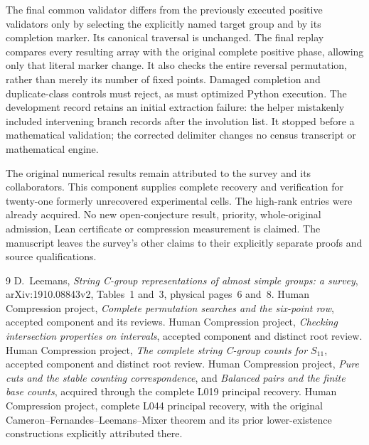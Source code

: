 \documentclass[10pt,a4paper]{article}
\begin{document}
The final common validator differs from the previously executed positive
validators only by selecting the explicitly named target group and by its
completion marker. Its canonical traversal is unchanged. The final replay
compares every resulting array with the original complete positive phase,
allowing only that literal marker change. It also checks the entire reversal
permutation, rather than merely its number of fixed points. Damaged completion
and duplicate-class controls must reject, as must optimized Python execution.
The development record retains an initial extraction failure: the helper
mistakenly included intervening branch records after the involution list.
It stopped before a mathematical validation; the corrected delimiter changes
no census transcript or mathematical engine.

The original numerical results remain attributed to the survey and its
collaborators. This component supplies complete recovery and verification
for twenty-one formerly unrecovered experimental cells. The high-rank
entries were already acquired. No new open-conjecture result, priority,
whole-original admission, Lean certificate or compression measurement is
claimed. The manuscript leaves the survey's other claims to their explicitly
separate proofs and source qualifications.

\begin{thebibliography}{9}\small
{} D.~Leemans, \emph{String C-group representations of almost
simple groups: a survey}, arXiv:1910.08843v2, Tables~1 and~3, physical
pages~6 and~8.
 Human Compression project, \emph{Complete permutation
searches and the six-point row}, accepted component and its reviews.
 Human Compression project, \emph{Checking intersection
properties on intervals}, accepted component and distinct root review.
 Human Compression project, \emph{The complete string
C-group counts for $S_{11}$}, accepted component and distinct root review.
 Human Compression project, \emph{Pure cuts and the stable
counting correspondence}, and \emph{Balanced pairs and the finite base
counts}, acquired through the complete L019 principal recovery.
 Human Compression project, complete L044 principal
recovery, with the original Cameron--Fernandes--Leemans--Mixer theorem
and its prior lower-existence constructions explicitly attributed there.
\end{thebibliography}
\end{document}
